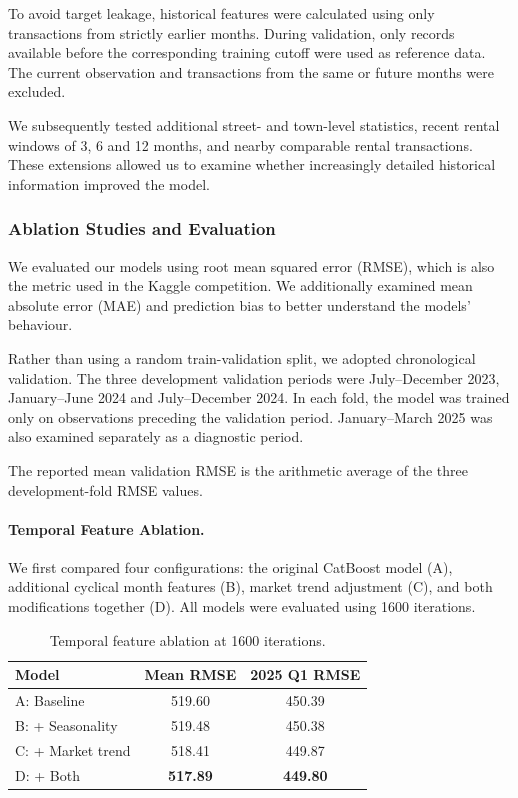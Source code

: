 \documentclass[11pt,a4paper]{article}
\begin{document}
To avoid target leakage, historical features were calculated using only transactions from strictly earlier months. During validation, only records available before the corresponding training cutoff were used as reference data. The current observation and transactions from the same or future months were excluded.

We subsequently tested additional street- and town-level statistics, recent rental windows of 3, 6 and 12 months, and nearby comparable rental transactions. These extensions allowed us to examine whether increasingly detailed historical information improved the model.


\subsubsection{Ablation Studies and Evaluation}

We evaluated our models using root mean squared error (RMSE), which is also the metric used in the Kaggle competition. We additionally examined mean absolute error (MAE) and prediction bias to better understand the models' behaviour.

Rather than using a random train-validation split, we adopted chronological validation. The three development validation periods were July--December 2023, January--June 2024 and July--December 2024. In each fold, the model was trained only on observations preceding the validation period. January--March 2025 was also examined separately as a diagnostic period.

The reported mean validation RMSE is the arithmetic average of the three development-fold RMSE values.

\paragraph{Temporal Feature Ablation.}
We first compared four configurations: the original CatBoost model (A), additional cyclical month features (B), market trend adjustment (C), and both modifications together (D). All models were evaluated using 1600 iterations.

\begin{table}[t]
\centering
\caption{Temporal feature ablation at 1600 iterations.}
\label{tab:temporal_ablation}
\small
\begin{tabular}{lcc}
\hline
Model & Mean RMSE & 2025 Q1 RMSE \\
\hline
A: Baseline & 519.60 & 450.39 \\
B: + Seasonality & 519.48 & 450.38 \\
C: + Market trend & 518.41 & 449.87 \\
D: + Both & \textbf{517.89} & \textbf{449.80} \\
\hline
\end{tabular}
\end{table}
\end{document}
